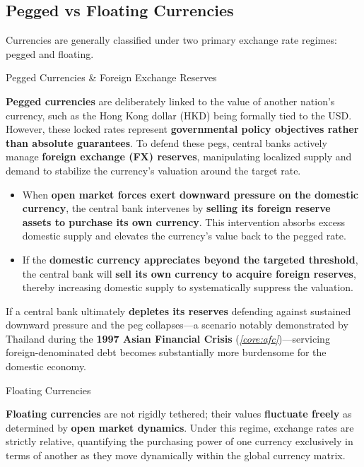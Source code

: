\documentclass[10pt]{article}
\begin{document}
  \subsection{Pegged vs Floating Currencies}

    Currencies are generally classified under two primary exchange rate regimes: pegged and floating. 

    \begin{core}[label=core:pegged_reserves]{Pegged Currencies \& Foreign Exchange Reserves}

      \textbf{Pegged currencies} are deliberately linked to the value of another nation's currency, such as the Hong Kong dollar (HKD) being formally tied to the USD. However, these locked rates represent \textbf{governmental policy objectives rather than absolute guarantees}. To defend these pegs, central banks actively manage \textbf{foreign exchange (FX) reserves}, manipulating localized supply and demand to stabilize the currency's valuation around the target rate. 

      \begin{itemize}

        \item When \textbf{open market forces exert downward pressure on the domestic currency}, the central bank intervenes by \textbf{selling its foreign reserve assets to purchase its own currency}. This intervention absorbs excess domestic supply and elevates the currency's value back to the pegged rate. 

        \item If the \textbf{domestic currency appreciates beyond the targeted threshold}, the central bank will \textbf{sell its own currency to acquire foreign reserves}, thereby increasing domestic supply to systematically suppress the valuation. 

      \end{itemize}

      If a central bank ultimately \textbf{depletes its reserves} defending against sustained downward pressure and the peg collapses---a scenario notably demonstrated by Thailand during the \textbf{1997 Asian Financial Crisis} (\textit{\autoref{core:afc}})---servicing foreign-denominated debt becomes substantially more burdensome for the domestic economy.

    \end{core}

    \begin{core}{Floating Currencies}

      \textbf{Floating currencies} are not rigidly tethered; their values \textbf{fluctuate freely} as determined by \textbf{open market dynamics}. Under this regime, exchange rates are strictly relative, quantifying the purchasing power of one currency exclusively in terms of another as they move dynamically within the global currency matrix.

    \end{core}
\end{document}
